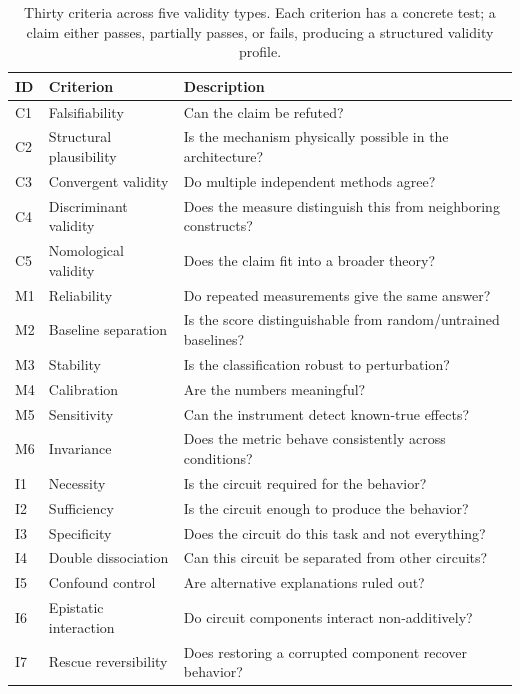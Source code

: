 \documentclass{article}
\begin{document}
\begingroup
{}
\begin{table}[H]
\centering
\small
\caption{Thirty criteria across five validity types. Each criterion has a concrete test; a claim either passes, partially passes, or fails, producing a structured validity profile.}
\label{tab:criteria}
\renewcommand{\arraystretch}{1.15}
\begin{tabular}{@{}llp{8.5cm}@{}}
\toprule
\textbf{ID} & \textbf{Criterion} & \textbf{Description} \\
\midrule
C1 & Falsifiability & Can the claim be refuted? \\
C2 & Structural plausibility & Is the mechanism physically possible in the architecture? \\
C3 & Convergent validity & Do multiple independent methods agree? \\
C4 & Discriminant validity & Does the measure distinguish this from neighboring constructs? \\
C5 & Nomological validity & Does the claim fit into a broader theory? \\
\midrule
M1 & Reliability & Do repeated measurements give the same answer? \\
M2 & Baseline separation & Is the score distinguishable from random/untrained baselines? \\
M3 & Stability & Is the classification robust to perturbation? \\
M4 & Calibration & Are the numbers meaningful? \\
M5 & Sensitivity & Can the instrument detect known-true effects? \\
M6 & Invariance & Does the metric behave consistently across conditions? \\
\midrule
I1 & Necessity & Is the circuit required for the behavior? \\
I2 & Sufficiency & Is the circuit enough to produce the behavior? \\
I3 & Specificity & Does the circuit do this task and not everything? \\
I4 & Double dissociation & Can this circuit be separated from other circuits? \\
I5 & Confound control & Are alternative explanations ruled out? \\
I6 & Epistatic interaction & Do circuit components interact non-additively? \\
I7 & Rescue reversibility & Does restoring a corrupted component recover behavior? \\

\end{tabular}
\end{table}
\end{document}
